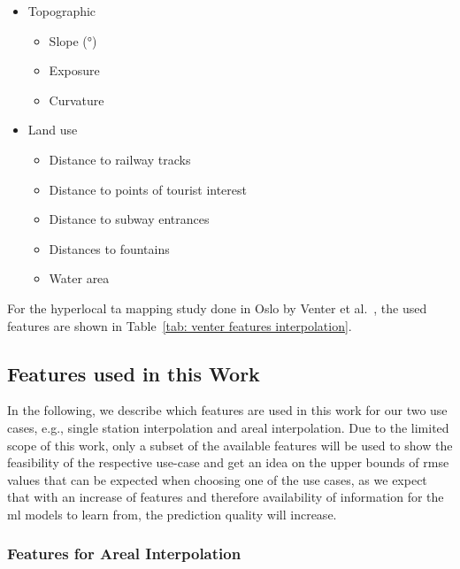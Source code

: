 \begin{itemize}
    \item Topographic

    \begin{itemize}
        \item Slope (°)
        \item Exposure
        \item Curvature
    \end{itemize}
    \item Land use

    \begin{itemize}
        \item Distance to railway tracks
        \item Distance to points of tourist interest
        \item Distance to subway entrances
        \item Distances to fountains
        \item Water area
    \end{itemize}
\end{itemize}

For the hyperlocal \gls{ta} mapping study done in Oslo by Venter et al.~\cite{venter2020hyperlocal}, the used features are shown in Table~\ref{tab: venter features interpolation}.

\subsection{Features used in this Work}

In the following, we describe which features are used in this work for our two use cases, e.g., single station interpolation and areal interpolation. Due to the limited scope of this work, only a subset of the available features will be used to show the feasibility of the respective use-case and get an idea on the upper bounds of \gls{rmse} values that can be expected when choosing one of the use cases, as we expect that with an increase of features and therefore availability of information for the \gls{ml} models to learn from, the prediction quality will increase.

\subsubsection{Features for Areal Interpolation}


